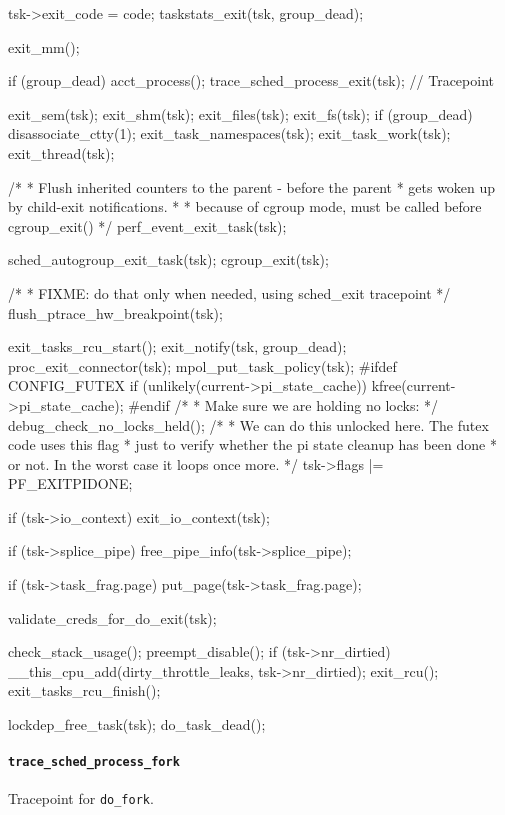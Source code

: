 \begin{code}
{	tsk->exit_code = code;
	taskstats_exit(tsk, group_dead);

	exit_mm();

	if (group_dead)
		acct_process();
	trace_sched_process_exit(tsk); // Tracepoint

	exit_sem(tsk);
	exit_shm(tsk);
	exit_files(tsk);
	exit_fs(tsk);
	if (group_dead)
		disassociate_ctty(1);
	exit_task_namespaces(tsk);
	exit_task_work(tsk);
	exit_thread(tsk);

	/*
	 * Flush inherited counters to the parent - before the parent
	 * gets woken up by child-exit notifications.
	 *
	 * because of cgroup mode, must be called before cgroup_exit()
	 */
	perf_event_exit_task(tsk);

	sched_autogroup_exit_task(tsk);
	cgroup_exit(tsk);

	/*
	 * FIXME: do that only when needed, using sched_exit tracepoint
	 */
	flush_ptrace_hw_breakpoint(tsk);

	exit_tasks_rcu_start();
	exit_notify(tsk, group_dead);
	proc_exit_connector(tsk);
	mpol_put_task_policy(tsk);
#ifdef CONFIG_FUTEX
	if (unlikely(current->pi_state_cache))
		kfree(current->pi_state_cache);
#endif
	/*
	 * Make sure we are holding no locks:
	 */
	debug_check_no_locks_held();
	/*
	 * We can do this unlocked here. The futex code uses this flag
	 * just to verify whether the pi state cleanup has been done
	 * or not. In the worst case it loops once more.
	 */
	tsk->flags |= PF_EXITPIDONE;

	if (tsk->io_context)
		exit_io_context(tsk);

	if (tsk->splice_pipe)
		free_pipe_info(tsk->splice_pipe);

	if (tsk->task_frag.page)
		put_page(tsk->task_frag.page);

	validate_creds_for_do_exit(tsk);

	check_stack_usage();
	preempt_disable();
	if (tsk->nr_dirtied)
		__this_cpu_add(dirty_throttle_leaks, tsk->nr_dirtied);
	exit_rcu();
	exit_tasks_rcu_finish();

	lockdep_free_task(tsk);
	do_task_dead();
}
\end{code}

  
\paragraph{\texttt{trace\_sched\_process\_fork}}
Tracepoint for \verb|do_fork|.

